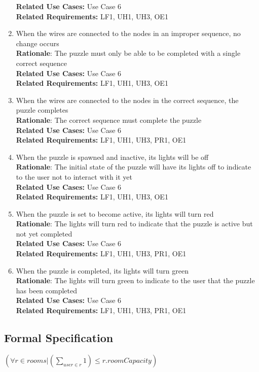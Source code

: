 \documentclass[12pt]{article}
\begin{document}
\begin{enumerate}[label=WP\arabic*., series=WiresPuzzle ]
        \textbf{Related Use Cases:} Use Case 6\\
        \textbf{Related Requirements:} LF1, UH1, UH3, OE1
        \item  When the wires are connected to the nodes in an improper sequence, no change occurs \\
        \textbf{Rationale}: The puzzle must only be able to be completed with a single correct sequence\\
        \textbf{Related Use Cases:} Use Case 6\\
        \textbf{Related Requirements:} LF1, UH1, UH3, OE1
        \item  When the wires are connected to the nodes in the correct sequence, the puzzle completes \\
        \textbf{Rationale}: The correct sequence must complete the puzzle\\
        \textbf{Related Use Cases:} Use Case 6\\
        \textbf{Related Requirements:} LF1, UH1, UH3, PR1, OE1
        \item When the puzzle is spawned and inactive, its lights will be off \\
        \textbf{Rationale}: The initial state of the puzzle will have its lights off to indicate to the user not to interact with it yet\\
        \textbf{Related Use Cases:} Use Case 6\\
        \textbf{Related Requirements:} LF1, UH1, UH3, OE1
        \item When the puzzle is set to become active, its lights will turn red \\
        \textbf{Rationale}: The lights will turn red to indicate that the puzzle is active but not yet completed\\
        \textbf{Related Use Cases:} Use Case 6\\
        \textbf{Related Requirements:} LF1, UH1, UH3, PR1, OE1
        \item When the puzzle is completed, its lights will turn green \\
        \textbf{Rationale}: The lights will turn green to indicate to the user that the puzzle has been completed\\
        \textbf{Related Use Cases:} Use Case 6\\
        \textbf{Related Requirements:} LF1, UH1, UH3, PR1, OE1
\end{enumerate}

\subsection{Formal Specification}
$(\forall r \in rooms  | (\sum\limits_{user \in r} 1)  \leq r.roomCapacity)$\\
\end{document}
